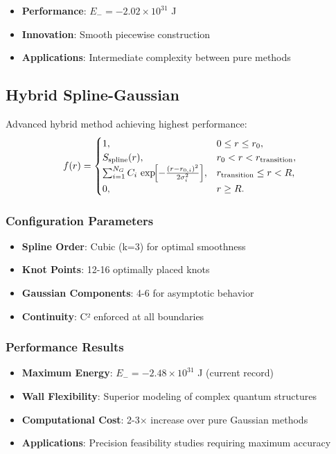 \documentclass[12pt]{article}
\begin{document}
\begin{itemize}
\item \textbf{Performance}: $E_- = -2.02\times10^{31}$ J
\item \textbf{Innovation}: Smooth piecewise construction
\item \textbf{Applications}: Intermediate complexity between pure methods
\end{itemize}

\subsection{Hybrid Spline-Gaussian}
Advanced hybrid method achieving highest performance:
\[
  f(r) = 
  \begin{cases}
    1, & 0 \le r \le r_0,\\
    S_{\text{spline}}(r), & r_0 < r < r_{\text{transition}},\\
    \sum_{i=1}^{N_G} C_i\,\exp\!\Bigl[-\tfrac{(r - r_{0,i})^2}{2\sigma_i^2}\Bigr], & r_{\text{transition}} \le r < R,\\
    0, & r \ge R.
  \end{cases}
\]

\subsubsection{Configuration Parameters}
\begin{itemize}
\item \textbf{Spline Order}: Cubic (k=3) for optimal smoothness
\item \textbf{Knot Points}: 12-16 optimally placed knots
\item \textbf{Gaussian Components}: 4-6 for asymptotic behavior
\item \textbf{Continuity}: C² enforced at all boundaries
\end{itemize}

\subsubsection{Performance Results}
\begin{itemize}
\item \textbf{Maximum Energy}: $E_- = -2.48\times10^{31}$ J (current record)
\item \textbf{Wall Flexibility}: Superior modeling of complex quantum structures
\item \textbf{Computational Cost}: 2-3× increase over pure Gaussian methods
\item \textbf{Applications}: Precision feasibility studies requiring maximum accuracy
\end{itemize}
\end{document}
